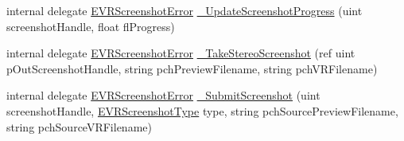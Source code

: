 \begin{DoxyCompactItemize}
\item 
internal delegate \mbox{\hyperlink{namespace_valve_1_1_v_r_ac73c6dcb1af8fe045a626296a21e226b}{E\+V\+R\+Screenshot\+Error}} \mbox{\hyperlink{struct_valve_1_1_v_r_1_1_i_v_r_screenshots_ad750f504a656fd6a77bda11e07a52cd3}{\+\_\+\+Update\+Screenshot\+Progress}} (uint screenshot\+Handle, float fl\+Progress)
\item 
internal delegate \mbox{\hyperlink{namespace_valve_1_1_v_r_ac73c6dcb1af8fe045a626296a21e226b}{E\+V\+R\+Screenshot\+Error}} \mbox{\hyperlink{struct_valve_1_1_v_r_1_1_i_v_r_screenshots_ac9eb5e2fe44b9b5a3af94f18dee0dca0}{\+\_\+\+Take\+Stereo\+Screenshot}} (ref uint p\+Out\+Screenshot\+Handle, string pch\+Preview\+Filename, string pch\+V\+R\+Filename)
\item 
internal delegate \mbox{\hyperlink{namespace_valve_1_1_v_r_ac73c6dcb1af8fe045a626296a21e226b}{E\+V\+R\+Screenshot\+Error}} \mbox{\hyperlink{struct_valve_1_1_v_r_1_1_i_v_r_screenshots_aa0b6789713552885537583e9ca318010}{\+\_\+\+Submit\+Screenshot}} (uint screenshot\+Handle, \mbox{\hyperlink{namespace_valve_1_1_v_r_a033ac579445f0992130b11ba62c9b7ae}{E\+V\+R\+Screenshot\+Type}} type, string pch\+Source\+Preview\+Filename, string pch\+Source\+V\+R\+Filename)
\end{DoxyCompactItemize}
